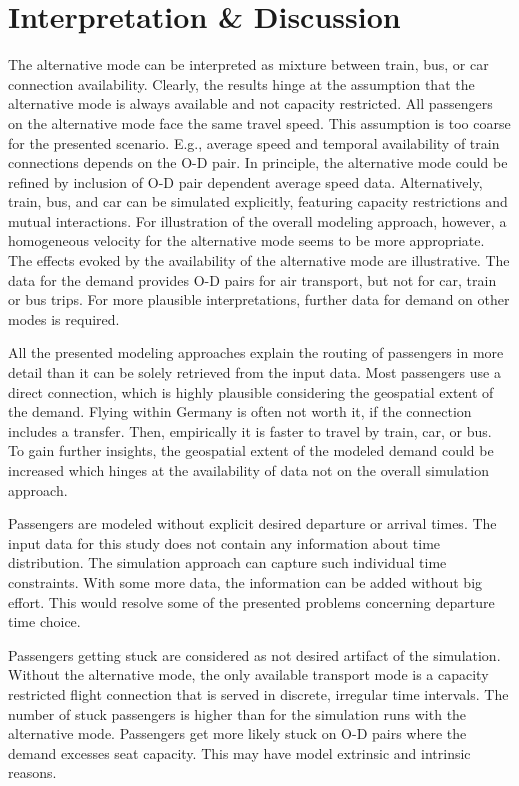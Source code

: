 \section{Interpretation \& Discussion}
\label{sec:air_rail_discussion}
The alternative mode can be interpreted as mixture between train, bus, or car connection availability. 
Clearly, the results hinge at the assumption that the alternative mode is always available and not capacity restricted.  
All passengers on the alternative mode face the same travel speed. 
This assumption is too coarse for the presented scenario. 
E.g., average speed and temporal availability of train connections depends on the O-D pair. 
In principle, the alternative mode could be refined by inclusion of O-D pair dependent average speed data. 
Alternatively, train, bus, and car can be simulated explicitly, featuring capacity restrictions and mutual interactions. 
For illustration of the overall modeling approach, however, a homogeneous velocity for the alternative mode seems to be more appropriate. 
The effects evoked by the availability of the alternative mode are illustrative. 
The data for the demand provides O-D pairs for air transport, but not for car, train or bus trips.  
For more plausible interpretations, further data for demand on other modes is required. 

All the presented modeling approaches explain the routing of passengers in more detail than it can be solely retrieved from the input data.  
Most passengers use a direct connection, which is highly plausible considering the geospatial extent of the demand.  
Flying within Germany is often not worth it, if the connection includes a transfer. 
Then, empirically it is faster to travel by train, car, or bus. 
To gain further insights, the geospatial extent of the modeled demand could be increased which hinges at the availability of data not on the overall simulation approach. 

Passengers are modeled without explicit desired departure or arrival times. 
The input data for this study does not contain any information about time distribution. 
The simulation approach can capture such individual time constraints.  
With some more data, the information can be added without big effort. 
This would resolve some of the presented problems concerning departure time choice. 

Passengers getting stuck are considered as not desired artifact of the simulation. 
Without the alternative mode, the only available transport mode is a capacity restricted flight connection that is served in discrete, irregular time intervals. 
The number of stuck passengers is higher than for the simulation runs with the alternative mode. 
Passengers get more likely stuck on O-D pairs where the demand excesses seat capacity. 
This may have model extrinsic and intrinsic reasons. 

